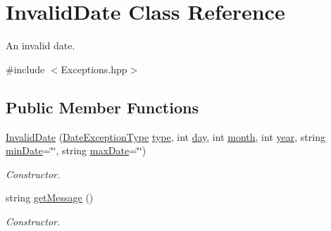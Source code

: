 \hypertarget{class_invalid_date}{}\section{Invalid\+Date Class Reference}
\label{class_invalid_date}


An invalid date.  




{\ttfamily \#include $<$Exceptions.\+hpp$>$}

\subsection*{Public Member Functions}
\begin{DoxyCompactItemize}
\item 
\hyperlink{class_invalid_date_a8f1350a762e69ee7fab3d96b8ec87455}{Invalid\+Date} (\hyperlink{_exceptions_8hpp_a3c07f150c56e3659483593a47dafc0e3}{Date\+Exception\+Type} \hyperlink{class_invalid_date_a2ec333a89688d1f90713e647720ffda1}{type}, int \hyperlink{class_invalid_date_ae88b81c9928d9f962229b4b60b1ca6e6}{day}, int \hyperlink{class_invalid_date_a63d1eb8cc29192ed24a608efaf8bb841}{month}, int \hyperlink{class_invalid_date_a796e1aee06941892afc67b4ebbbd84c3}{year}, string \hyperlink{class_invalid_date_ae3e99c48b2b32f9f88f1393f1d331ac8}{min\+Date}=\char`\"{}\char`\"{}, string \hyperlink{class_invalid_date_aa7a1be9dd6f1df990c62734800381c2a}{max\+Date}=\char`\"{}\char`\"{})
\begin{DoxyCompactList}\small\item\em Constructor. \end{DoxyCompactList}\item 
string \hyperlink{class_invalid_date_a45284da771728ac2840c252fd261acb5}{get\+Message} ()
\begin{DoxyCompactList}\small\item\em Constructor. \end{DoxyCompactList}\end{DoxyCompactItemize}
